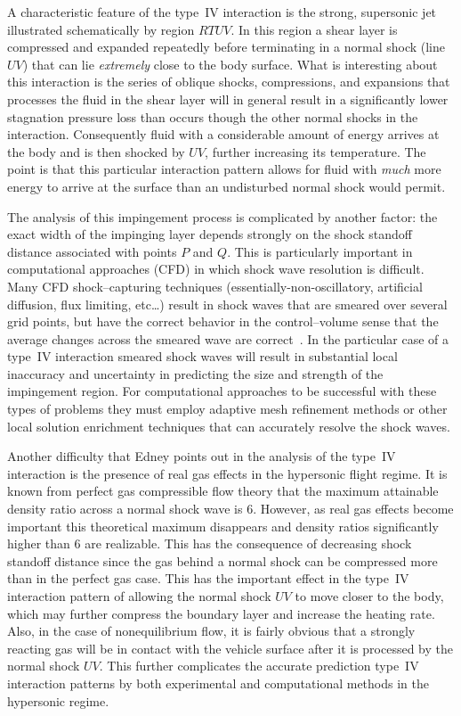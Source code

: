 A characteristic feature of the type~IV interaction is the strong, supersonic jet illustrated schematically by region $RTUV$. In this region a shear layer is compressed and expanded repeatedly before terminating in a normal shock (line $UV$) that can lie \emph{extremely} close to the body surface.  What is interesting about this interaction is the series of oblique shocks, compressions, and expansions that processes the fluid in the shear layer will in general result in a significantly lower stagnation pressure loss than occurs though the other normal shocks in the interaction.  Consequently fluid with a considerable amount of energy arrives at the body and is then shocked by $UV$, further increasing its temperature.  The point is that this particular interaction pattern allows for fluid with \emph{much} more energy to arrive at the surface than an undisturbed normal shock would permit. 

The analysis of this impingement process is complicated by another factor:  the exact width of the impinging layer depends strongly on the shock standoff distance associated with points $P$ and $Q$.  This is particularly important in computational approaches (CFD) in which shock wave resolution is difficult.  Many CFD shock--capturing techniques (essentially-non-oscillatory, artificial diffusion, flux limiting, etc\ldots) result in shock waves that are smeared over several grid points, but have the correct behavior in the control--volume sense that the average changes across the smeared wave are correct~\cite{cfmht}.  In the particular case of a type~IV interaction smeared shock waves will result in substantial local inaccuracy and uncertainty in predicting the size and strength of the impingement region.  For computational approaches to be successful with these types of problems they must employ adaptive mesh refinement methods or other local solution enrichment techniques that can accurately resolve the shock waves.  

Another difficulty that Edney points out in the analysis of the type~IV interaction is the presence of real gas effects in the hypersonic flight regime.  It is known from perfect gas compressible flow theory that the maximum attainable density ratio across a normal shock wave is 6.  However, as real gas effects become important this theoretical maximum disappears and density ratios significantly higher than 6 are realizable.  This has the consequence of decreasing shock standoff distance since the gas behind a normal shock can be compressed more than in the perfect gas case.  This has the important effect in the type~IV interaction pattern of allowing the normal shock $UV$ to move closer to the body, which may further compress the boundary layer and increase the heating rate.  Also, in the case of nonequilibrium flow, it is fairly obvious that a strongly reacting gas will be in contact with the vehicle surface after it is processed by the normal shock $UV$. This further complicates the accurate prediction type~IV interaction patterns by both experimental and computational methods in the hypersonic regime.


